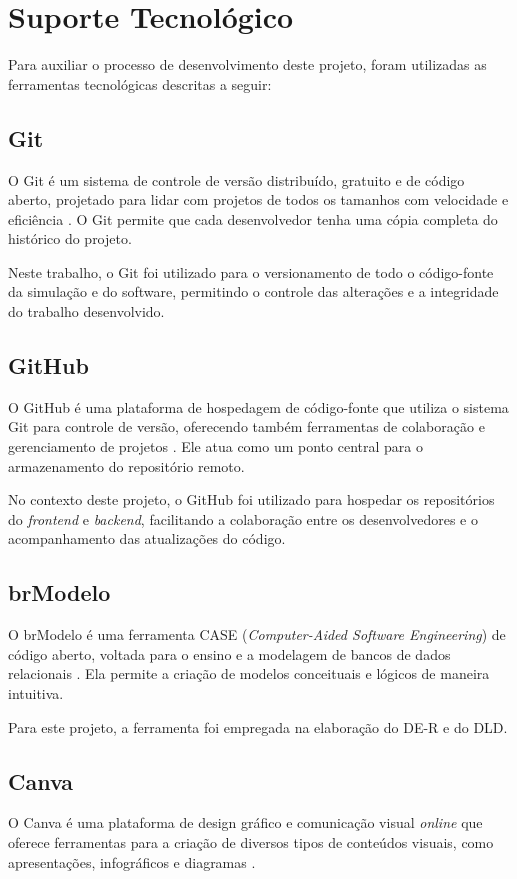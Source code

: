 \clearpage

\section[Suporte Tecnológico]{Suporte Tecnológico}

Para auxiliar o processo de desenvolvimento deste projeto, foram utilizadas as ferramentas tecnológicas descritas a seguir:

\subsection[Git]{Git}
O Git é um sistema de controle de versão distribuído, gratuito e de código aberto, projetado para lidar com projetos de todos os tamanhos com velocidade e eficiência \cite{git2026}. O Git permite que cada desenvolvedor tenha uma cópia completa do histórico do projeto.

Neste trabalho, o Git foi utilizado para o versionamento de todo o código-fonte da simulação e do software, permitindo o controle das alterações e a integridade do trabalho desenvolvido.

\subsection[GitHub]{GitHub}
O GitHub é uma plataforma de hospedagem de código-fonte que utiliza o sistema Git para controle de versão, oferecendo também ferramentas de colaboração e gerenciamento de projetos \cite{github2026}. Ele atua como um ponto central para o armazenamento do repositório remoto.

No contexto deste projeto, o GitHub foi utilizado para hospedar os repositórios do \textit{frontend} e \textit{backend}, facilitando a colaboração entre os desenvolvedores e o acompanhamento das atualizações do código.

\subsection[brModelo]{brModelo}
O brModelo é uma ferramenta CASE (\textit{Computer-Aided Software Engineering}) de código aberto, voltada para o ensino e a modelagem de bancos de dados relacionais \cite{candido2020brmodelo}. Ela permite a criação de modelos conceituais e lógicos de maneira intuitiva.

Para este projeto, a ferramenta foi empregada na elaboração do DE-R e do DLD.

\subsection[Canva]{Canva}
O Canva é uma plataforma de design gráfico e comunicação visual \textit{online} que oferece ferramentas para a criação de diversos tipos de conteúdos visuais, como apresentações, infográficos e diagramas \cite{canva2026}.


